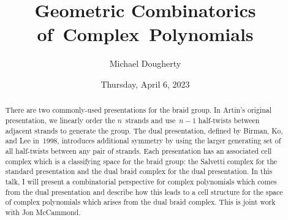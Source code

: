 \documentclass{UAmathtalk}
\author{Michael Dougherty}
\title{Geometric Combinatorics of~Complex~Polynomials}
\date{Thursday, April 6, 2023}
\begin{document}
\maketitle

\begin{abstract}
There are two commonly-used presentations for the braid group. In Artin's original presentation, we linearly order the $n$~strands and use~$n-1$ half-twists between adjacent strands to generate the group. The dual presentation, defined by Birman, Ko, and Lee in~1998, introduces additional symmetry by using the larger generating set of all half-twists between any pair of strands. Each presentation has an associated cell complex which is a classifying space for the braid group: the Salvetti complex for the standard presentation and the dual braid complex for the dual presentation. In this talk, I will present a combinatorial perspective for complex polynomials which comes from the dual presentation and describe how this leads to a cell structure for the space of complex polynomials which arises from the dual braid complex. This is joint work with Jon McCammond.
\end{abstract}
\end{document}
